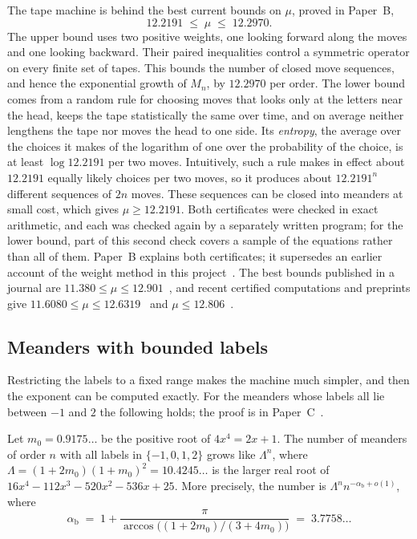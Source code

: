 The tape machine is behind the best current bounds on $\mu$, proved in Paper~B,
\[ 12.2191\;\le\;\mu\;\le\;12.2970 .\]
The upper bound uses two positive weights, one looking forward along the moves and one looking
backward. Their paired inequalities control a symmetric operator on every finite set of tapes.
This bounds the number of closed move sequences, and hence the exponential growth of $M_n$,
by $12.2970$ per order.
The lower bound comes from a random rule for choosing moves that looks only at the letters near
the head, keeps the tape statistically the same over time, and on average neither lengthens the
tape nor moves the head to one side. Its \emph{entropy}, the average over the choices it makes
of the logarithm of one over the probability of the choice, is at least $\log 12.2191$ per two
moves. Intuitively, such a rule makes in effect about $12.2191$ equally likely choices per two
moves, so it produces about $12.2191^n$ different sequences of $2n$ moves. These sequences can be
closed into meanders at small cost, which gives $\mu\ge12.2191$. Both certificates were checked in exact arithmetic, and each was checked again by a
separately written program; for the lower bound, part of this second check covers a sample of
the equations rather than all of them. Paper~B explains both certificates; it supersedes an
earlier account of the weight method in this project~\cite{BoundsPaper}. The best bounds
published in a journal are $11.380\le\mu\le12.901$~\cite{AP}, and recent certified computations
and preprints give $11.6080\le\mu\le12.6319$~\cite{Fox} and $\mu\le12.806$~\cite{CDDV}.

\subsection{Meanders with bounded labels}\label{sec:band}

Restricting the labels to a fixed range makes the machine much simpler, and then the exponent
can be computed exactly. For the meanders whose labels all lie between $-1$ and $2$ the following
holds; the proof is in Paper~C~\cite{PaperC}.

\begin{theorem}\label{thm:band}
Let $m_0=0.9175\ldots$ be the positive root of $4x^4=2x+1$. The number of meanders of order $n$
with all labels in $\{-1,0,1,2\}$ grows like $\Lambda^n$, where
$\Lambda=(1+2m_0)(1+m_0)^2=10.4245\ldots$ is the larger real root of
$16x^4-112x^3-520x^2-536x+25$. More precisely, the number is $\Lambda^n n^{-\alpha_{\mathrm b}+o(1)}$, where
\[ \alpha_{\mathrm b} \;=\; 1+\frac{\pi}{\arccos\!\big((1+2m_0)/(3+4m_0)\big)} \;=\; 3.7758\ldots \]
\end{theorem}

